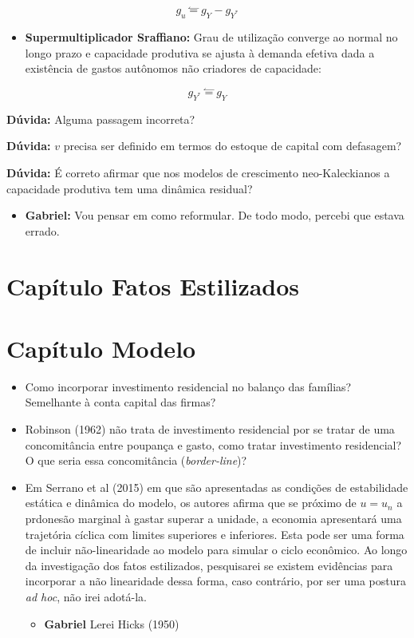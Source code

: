 \documentclass[]{article}
\providecommand{\tightlist}{%
  \setlength{\itemsep}{0pt}\setlength{\parskip}{0pt}}
\begin{document}
\begin{equation}
g_u \stackrel{\leftharpoonup}{=} g_Y - g_{Y^*}
\end{equation}

\begin{itemize}
\tightlist
\item
  \textbf{Supermultiplicador Sraffiano:} Grau de utilização converge ao
  normal no longo prazo e capacidade produtiva se ajusta à demanda
  efetiva dada a existência de gastos autônomos não criadores de
  capacidade:
\end{itemize}

\begin{equation}
g_{Y^*} \stackrel{\leftharpoonup}{=} g_Y
\end{equation}

\textbf{Dúvida:} Alguma passagem incorreta?

\textbf{Dúvida:} \(v\) precisa ser definido em termos do estoque de
capital com defasagem?

\textbf{Dúvida:} É correto afirmar que nos modelos de crescimento
neo-Kaleckianos a capacidade produtiva tem uma dinâmica residual? 
\begin{itemize}
    \item \textbf{Gabriel:} Vou pensar em como reformular. De todo modo, percebi que estava errado.
\end{itemize}

\section{Capítulo Fatos Estilizados}\label{capitulo-fatos-estilizados}

\section{Capítulo Modelo}\label{capitulo-modelo}

\begin{itemize}
\item
  [\open] Como incorporar investimento residencial no balanço das
  famílias? Semelhante à conta capital das firmas?
\item
  [\open] Robinson (1962) não trata de investimento residencial por se
  tratar de uma concomitância entre poupança e gasto, como tratar
  investimento residencial? O que seria essa concomitância
  (\emph{border-line})?
\item
  Em Serrano et al (2015) em que são apresentadas as condições de
  estabilidade estática e dinâmica do modelo, os autores afirma que se
  próximo de \(u=u_n\) a prdonesão marginal à gastar superar a unidade,
  a economia apresentará uma trajetória cíclica com limites superiores e
  inferiores. Esta pode ser uma forma de incluir não-linearidade ao
  modelo para simular o ciclo econômico. Ao longo da investigação dos
  fatos estilizados, pesquisarei se existem evidências para incorporar a
  não linearidade dessa forma, caso contrário, por ser uma postura
  \emph{ad hoc}, não irei adotá-la.
  \begin{itemize}
      \item \textbf{Gabriel} Lerei Hicks (1950)
  \end{itemize}
\end{itemize}
\end{document}
